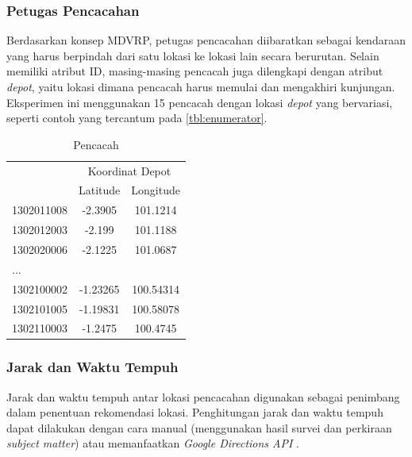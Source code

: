 \subsubsection{Petugas Pencacahan}
Berdasarkan konsep MDVRP, petugas pencacahan diibaratkan sebagai kendaraan yang harus berpindah dari satu lokasi ke lokasi lain secara berurutan. Selain memiliki atribut ID, masing-masing pencacah juga dilengkapi dengan atribut \textit{depot}, yaitu lokasi dimana pencacah harus memulai dan mengakhiri kunjungan. Eksperimen ini menggunakan 15 pencacah dengan lokasi \textit{depot} yang bervariasi, seperti contoh yang tercantum pada \autoref{tbl:enumerator}.


\begin{table}[!]
	\centering
	\caption{Pencacah}
	\label{tbl:enumerator}
	\begin{tabular}{lcc}
		\toprule
		& \multicolumn{2}{c}{Koordinat Depot}\\
		\cmidrule{2-3}
		& Latitude & Longitude\\ 
		\midrule
		1302011008 & -2.3905 & 101.1214\\
		1302012003 & -2.199 & 101.1188\\
		1302020006 & -2.1225 & 101.0687\\
		...\\
		1302100002 & -1.23265 & 100.54314\\
		1302101005 & -1.19831 & 100.58078\\
		1302110003 & -1.2475 & 100.4745\\
		\bottomrule
	\end{tabular}
\end{table}


\subsubsection{Jarak dan Waktu Tempuh}
\label{ss:distance-duration-matrix}
Jarak dan waktu tempuh antar lokasi pencacahan digunakan sebagai penimbang dalam penentuan rekomendasi lokasi. Penghitungan jarak dan waktu tempuh dapat dilakukan dengan cara manual (menggunakan hasil survei dan perkiraan \textit{subject matter}) atau memanfaatkan \textit{Google Directions API} \citep{google_google_2016}. 


